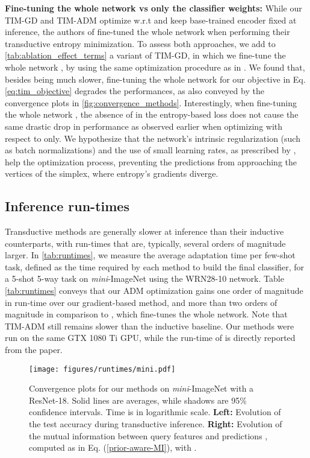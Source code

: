 \documentclass{article}
\begin{document}
        \textbf{Fine-tuning the whole network vs only the classifier weights: }
            While our TIM-GD and TIM-ADM optimize w.r.t  and keep base-trained encoder  fixed at inference, the authors of \cite{dhillon2019baseline} fine-tuned the whole network  when performing their transductive entropy minimization. To assess both approaches, we add to \autoref{tab:ablation_effect_terms} a variant of TIM-GD, in which we fine-tune the whole network , by using the same optimization procedure as in \cite{dhillon2019baseline}. We found that, besides being much slower, fine-tuning the whole network for our objective in Eq. \ref{eq:tim_objective} degrades the performances, as also conveyed by the convergence plots in \autoref{fig:convergence_methods}. 
Interestingly, when fine-tuning the whole network ,  the absence of  in the entropy-based loss  does not cause the same drastic drop in performance as observed earlier when optimizing with respect to  only. We hypothesize that the network's intrinsic regularization (such as batch normalizations) and the use of small learning rates, as prescribed by \cite{dhillon2019baseline}, help the optimization process, preventing the predictions from approaching the vertices of the simplex, where entropy's gradients diverge.






    \subsection{Inference run-times}
        Transductive methods are generally slower at inference than their inductive counterparts, with run-times that are, typically, several orders of magnitude larger. In \autoref{tab:runtimes}, we measure the average adaptation time per few-shot task, defined as the time required by each method to build the final classifier, for a 5-shot 5-way task on \textit{mini}-ImageNet using the WRN28-10 network. Table \ref{tab:runtimes} conveys that our ADM optimization gains one order of magnitude in run-time over our gradient-based method, and more than two orders of magnitude in comparison to \cite{dhillon2019baseline}, which fine-tunes the whole network. Note that TIM-ADM still remains slower than the inductive baseline. Our methods were run on the same GTX 1080 Ti GPU, while the run-time of \cite{dhillon2019baseline} is directly reported from the paper. 



\begin{figure}[t]
            \centering
            \texttt{[image: figures/runtimes/mini.pdf]}
            \caption{Convergence plots for our methods on \textit{mini}-ImageNet with a ResNet-18. Solid lines are averages, while shadows are 95\% confidence intervals. Time is in logarithmic scale. \textbf{Left:} Evolution of the test accuracy during transductive inference. \textbf{Right:} Evolution of the mutual information between query features and predictions , computed as in Eq. (\ref{prior-aware-MI}), with .}
            \label{fig:convergence_methods}
        \end{figure}
        
\end{document}
